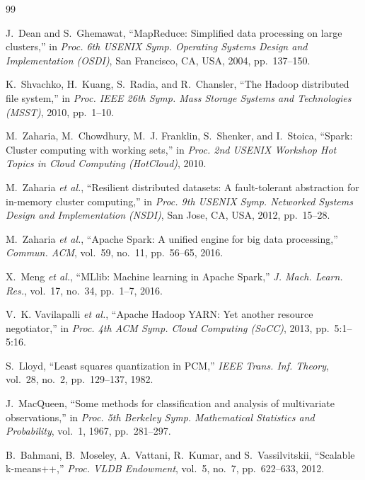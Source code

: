 \documentclass[conference,a4paper]{IEEEtran}
\begin{document}
\begin{thebibliography}{99}
\setlength{\itemsep}{0pt}
\setlength{\parskip}{0pt}

J.~Dean and S.~Ghemawat, ``MapReduce: Simplified data processing on large clusters,'' in \textit{Proc. 6th USENIX Symp. Operating Systems Design and Implementation (OSDI)}, San Francisco, CA, USA, 2004, pp.~137--150.

K.~Shvachko, H.~Kuang, S.~Radia, and R.~Chansler, ``The Hadoop distributed file system,'' in \textit{Proc. IEEE 26th Symp. Mass Storage Systems and Technologies (MSST)}, 2010, pp.~1--10.

M.~Zaharia, M.~Chowdhury, M.~J. Franklin, S.~Shenker, and I.~Stoica, ``Spark: Cluster computing with working sets,'' in \textit{Proc. 2nd USENIX Workshop Hot Topics in Cloud Computing (HotCloud)}, 2010.

M.~Zaharia \textit{et al.}, ``Resilient distributed datasets: A fault-tolerant abstraction for in-memory cluster computing,'' in \textit{Proc. 9th USENIX Symp. Networked Systems Design and Implementation (NSDI)}, San Jose, CA, USA, 2012, pp.~15--28.

M.~Zaharia \textit{et al.}, ``Apache Spark: A unified engine for big data processing,'' \textit{Commun. ACM}, vol.~59, no.~11, pp.~56--65, 2016.

X.~Meng \textit{et al.}, ``MLlib: Machine learning in Apache Spark,'' \textit{J. Mach. Learn. Res.}, vol.~17, no.~34, pp.~1--7, 2016.

V.~K. Vavilapalli \textit{et al.}, ``Apache Hadoop YARN: Yet another resource negotiator,'' in \textit{Proc. 4th ACM Symp. Cloud Computing (SoCC)}, 2013, pp.~5:1--5:16.

S.~Lloyd, ``Least squares quantization in PCM,'' \textit{IEEE Trans. Inf. Theory}, vol.~28, no.~2, pp.~129--137, 1982.

J.~MacQueen, ``Some methods for classification and analysis of multivariate observations,'' in \textit{Proc. 5th Berkeley Symp. Mathematical Statistics and Probability}, vol.~1, 1967, pp.~281--297.

B.~Bahmani, B.~Moseley, A.~Vattani, R.~Kumar, and S.~Vassilvitskii, ``Scalable k-means++,'' \textit{Proc. VLDB Endowment}, vol.~5, no.~7, pp.~622--633, 2012.


\end{thebibliography}
\end{document}
